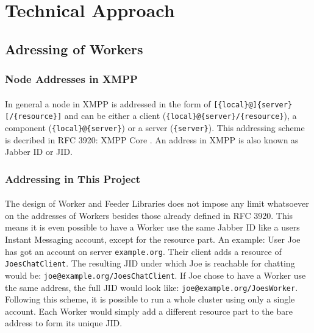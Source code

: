 \section{Technical Approach}
\paragraph{}

\subsection{Adressing of Workers}
\paragraph{}
\subsubsection{Node Addresses in XMPP}
\paragraph{}
In general a node in XMPP is addressed in the form of \texttt{[\{local\}@]\{server\}[/\{resource\}]} and can be either a client (\texttt{\{local\}@\{server\}/\{resource\}}), a component (\texttt{\{local\}@\{server\}}) or a server (\texttt{\{server\}}). This addressing scheme is decribed in RFC 3920: XMPP Core \cite{xmpp-core}. An address in XMPP is also known as Jabber ID or JID.

\subsubsection{Addressing in This Project}
\label{sec:addr}
\paragraph{}
The design of Worker and Feeder Libraries does not impose any limit whatsoever on the addresses of Workers besides those already defined in RFC 3920. This means it is even possible to have a Worker use the same Jabber ID like a users Instant Messaging account, except for the resource part. An example: User Joe has got an account on server \texttt{example.org}. Their client adds a resource of \texttt{JoesChatClient}. The resulting JID under which Joe is reachable for chatting would be: \texttt{joe@example.org/JoesChatClient}. If Joe chose to have a Worker use the same address, the full JID would look like: \texttt{joe@example.org/JoesWorker}. Following this scheme, it is possible to run a whole cluster using only a single account. Each Worker would simply add a different resource part to the bare address to form its unique JID.
